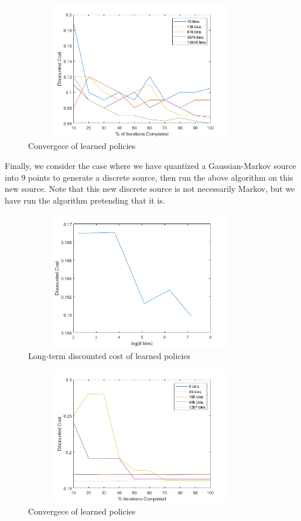 \documentclass{article}
\begin{document}
\begin{figure}[H]
    \centering
    \includegraphics[height=6cm, width=10cm]{convergence_16.png}
    \caption{Convergece of learned policies}
\end{figure}

Finally, we consider the case where we have quantized a Gaussian-Markov source into 9 points to generate a discrete source, then run the above algorithm on this new source. Note that this new discrete source is not necessarily Markov, but we have run the algorithm pretending that it is.

\begin{figure}[H]
    \centering
    \includegraphics[height=6cm, width=10cm]{cost_gaussian.png}
    \caption{Long-term discounted cost of learned policies}
\end{figure}

\begin{figure}[H]
    \centering
    \includegraphics[height=6cm, width=10cm]{convergence_gaussian.png}
    \caption{Convergece of learned policies}
\end{figure}
\end{document}
